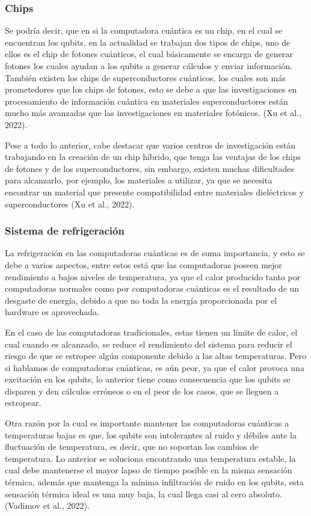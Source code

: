 \documentclass[twoside]{article}
\begin{document}
\subsubsection{Chips}
Se podría decir, que en si la computadora cuántica es un chip, en el cual se encuentran los qubits, en la actualidad se trabajan dos tipos de chips, uno de ellos es el chip de fotones cuánticos, el cual básicamente se encarga de generar fotones los cuales ayudan a los qubits a generar cálculos y enviar información. También existen los chips de superconductores cuánticos, los cuales son más prometedores que los chips de fotones, esto se debe a que las investigaciones en procesamiento de información cuántica en materiales superconductores están mucho más avanzadas que las investigaciones en materiales fotónicos. (Xu et al., 2022).

Pese a todo lo anterior, cabe destacar que varios centros de investigación están trabajando en la creación de un chip híbrido, que tenga las ventajas de los chips de fotones y de los superconductores, sin embargo, existen muchas dificultades para alcanzarlo, por ejemplo, los materiales a utilizar, ya que se necesita encontrar un material que presente compatibilidad entre materiales dieléctricos y superconductores (Xu et al., 2022).

\subsubsection{Sistema de refrigeración}
La refrigeración en las computadoras cuánticas es de suma importancia, y esto se debe a varios aspectos, entre estos está que las computadoras poseen mejor rendimiento a bajos niveles de temperatura, ya que el calor producido tanto por computadoras normales como por computadoras cuánticas es el resultado de un desgaste de energía, debido a que no toda la energía proporcionada por el hardware es aprovechada.
 
En el caso de las computadoras tradicionales, estas tienen un límite de calor, el cual cuando es alcanzado, se reduce el rendimiento del sistema para reducir el riesgo de que se estropee algún componente debido a las altas temperaturas. Pero si hablamos de computadoras cuánticas, es aún peor, ya que el calor provoca una excitación en los qubits, lo anterior tiene como consecuencia que los qubits se disparen y den cálculos erróneos o en el peor de los casos, que se lleguen a estropear. 

Otra razón por la cual es importante mantener las computadoras cuánticas a temperaturas bajas es que, los qubits son intolerantes al ruido y débiles ante la fluctuación de temperatura, es decir, que no soportan los cambios de temperatura. Lo anterior se soluciona encontrando una temperatura estable, la cual debe mantenerse el mayor lapso de tiempo posible en la misma sensación térmica, además que mantenga la mínima infiltración de ruido en los qubits, esta sensación térmica ideal es una muy baja, la cual llega casi al cero absoluto. (Vadimov et al., 2022).
\end{document}
